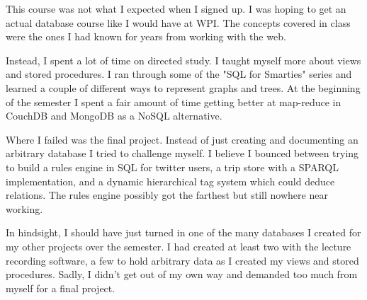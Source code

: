

\begin{courseselfeval}
This course was not what I expected when I signed up. I was hoping to
get an actual database course like I would have at WPI. The concepts
covered in class were the ones I had known for years from working with
the web.

Instead, I spent a lot of time on directed study. I taught myself more
about views and stored procedures. I ran through some of the "SQL for
Smarties" series and learned a couple of different ways to represent
graphs and trees. At the beginning of the semester I spent a fair amount
of time getting better at map-reduce in CouchDB and MongoDB as a NoSQL
alternative.

Where I failed was the final project. Instead of just creating and
documenting an arbitrary database I tried to challenge myself. I
believe I bounced between trying to build a rules engine in SQL for
twitter users, a trip store with a SPARQL implementation, and a dynamic
hierarchical tag system which could deduce relations. The rules engine
possibly got the farthest but still nowhere near working.

In hindsight, I should have just turned in one of the many databases I
created for my other projects over the semester. I had created at least
two with the lecture recording software, a few to hold arbitrary data as
I created my views and stored procedures. Sadly, I didn't get out of my
own way and demanded too much from myself for a final project.
\end{courseselfeval}


